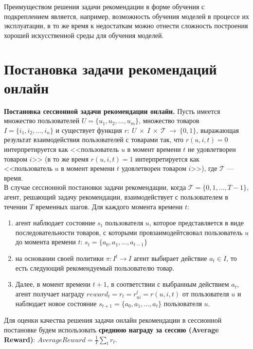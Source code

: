 \documentclass{mipt-thesis-ms}
\begin{document}
Преимуществом решения задачи рекомендации в форме обучения с подкреплением является, например, возможность обучения моделей в процессе их эксплуатации, в то же время к недостаткам можно отнести сложность построения хорошей искусственной среды для обучения моделей.

\section{Постановка задачи рекомендаций онлайн}
{\bf Постановка сессионной задачи рекомендации онлайн.} Пусть имеется множество пользователей $U = \{u_1, u_2, \dots, u_m\}$, множество товаров $I = \{i_1, i_2, \dots, i_n\}$ и существует функция $r:~U~\times~I~\times~\mathcal{T}~\rightarrow~\{0,  1\}$, выражающая результат взаимодействия пользователей с товарами так, что $r(u, i, t) = 0$ интерпретируется как <<пользователь $u$ в момент времени $t$ не удовлетворен товаром $i$>> (в то же время $r(u, i, t) = 1$ интерпретируется как <<пользователь $u$ в момент времени $t$ удовлетворен товаром $i$>>), где $\mathcal{T}$ --- время.\\
В случае сессионной постановки задачи рекомендации, когда $\mathcal{T} = \{0, 1, \dots, T - 1\}$, агент, решающий задачу рекомендации, взаимодействует с пользователем в течении $T$ временных шагов. Для каждого момента времени $t$: \\
\begin{enumerate}
\item агент наблюдает состояние $s_t$ пользователя $u$, которое представляется в виде последовательности товаров, с которыми провзаимодейтсвовал пользователь $u$ до момента времени $t$: $s_t = \{a_0, a_1, \dots, a_{t-1}\}$ \\
\item на основании своей политики $\pi: I^t \rightarrow I$ агент выбирает действие $a_t \in I$, то есть следующий рекомендуемый пользователю товар. 
\item Далее, в момент времени $t+1$, в соответствии с выбранным действием $a_t$, агент получает награду ${reward}_t = r_t = r^{t}_{ui} = r(u, i, t)$ от пользователя $u$ и наблюдает новое состояние $s_{t+1} = \{a_0, a_1, \dots, a_{t}\}$ пользователя $u$. 
\end{enumerate}

Для оценки качества решения задачи онлайн рекомендации в сессионной постановке будем использовать {\bf среднюю награду за сессию (Average Reward)}: $AverageReward = \frac1T \sum_t r_t$.\\
\end{document}
